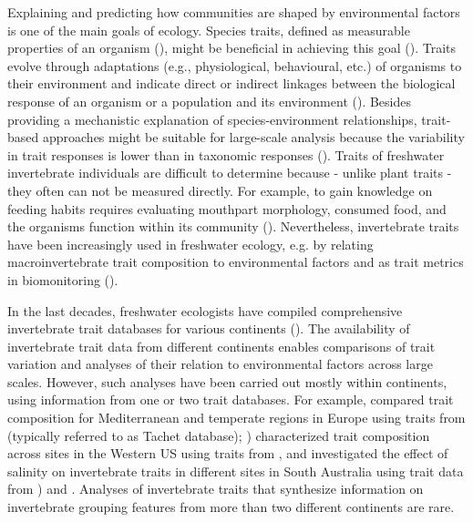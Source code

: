 \documentclass{article}
\begin{document}
Explaining and predicting how communities are shaped by environmental factors is one of the main goals of ecology. Species traits, defined as measurable properties of an organism (\cite{mcgill_rebuilding_2006}), might be beneficial in achieving this goal (\cite{heino_jani_macroecological_2013}). Traits evolve through adaptations (e.g., physiological, behavioural, etc.) of organisms to their environment and indicate direct or indirect linkages between the biological response of an organism or a population and its environment (\cite{southwood_habitat_1977, verberk_delivering_2013}).
Besides providing a mechanistic explanation of species-environment relationships, trait-based approaches might be suitable for large-scale analysis because the variability in trait responses is lower than in taxonomic responses (\cite{bonada_taxonomic_2007, baird_toward_2011}). Traits of freshwater invertebrate individuals are difficult to determine because - unlike plant traits - they often can not be measured directly. For example, to gain knowledge on feeding habits requires evaluating mouthpart morphology, consumed food, and the organisms function within its community (\cite{moog_comprehensive_nodate}). Nevertheless, invertebrate traits have been increasingly used in freshwater ecology, e.g. by relating macroinvertebrate trait composition to environmental factors and as trait metrics in biomonitoring (\cite{poff_developing_2010, szocs_effects_2014, bhowmik_large_2015, menezes_beyond_2010}).

In the last decades, freshwater ecologists have compiled comprehensive invertebrate trait databases for various continents (\cite{usseglio-polatera_biomonitoring_2000, schmidt-kloiber_www.freshwaterecology.info_2015, vieira_database_nodate, Philips_and_Smith_NZ_DB_2018, kefford_integrated_2020, tomanova_trophic_2006}). The availability of invertebrate trait data from different continents enables comparisons of trait variation and analyses of their relation to environmental factors across large scales. However, such analyses have been carried out mostly within continents, using information from one or two trait databases. For example, \citet{bonada_taxonomic_2007} compared trait composition for Mediterranean and temperate regions in Europe using traits from \citet{usseglio-polatera_biomonitoring_2000} (typically referred to as Tachet database); \citet{poff_developing_2010}) characterized trait composition across sites in the Western US using traits from \citet{poff_functional_2006}, and \citet{botwe_effects_2018} investigated the effect of salinity on invertebrate traits in different sites in South Australia using trait data from \citet{poff_functional_2006}) and \citet{schafer_trait_2011}. Analyses of invertebrate traits that synthesize information on invertebrate grouping features from more than two different continents are rare. 
\end{document}
